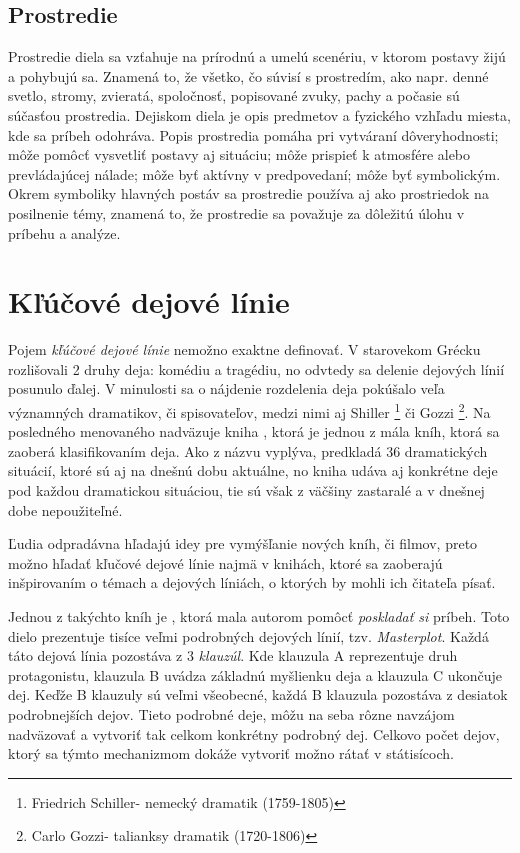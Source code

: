\subsection*{Prostredie}
Prostredie diela sa vzťahuje na prírodnú a umelú scenériu, v ktorom postavy žijú a pohybujú sa. Znamená to, že všetko, čo súvisí s prostredím, ako napr. denné svetlo, stromy, zvieratá, spoločnosť, popisované zvuky, pachy a počasie sú súčasťou prostredia. Dejiskom diela je opis predmetov a fyzického vzhľadu miesta, kde sa príbeh odohráva.
Popis prostredia pomáha pri vytváraní dôveryhodnosti; môže pomôcť vysvetliť postavy aj situáciu; môže prispieť k atmosfére alebo prevládajúcej nálade; môže byť aktívny v predpovedaní; môže byť symbolickým. Okrem symboliky hlavných postáv sa prostredie používa aj ako prostriedok na posilnenie témy, znamená to, že prostredie sa považuje za dôležitú úlohu v príbehu a analýze.


\section{Kľúčové dejové línie}
Pojem \textit{kľúčové dejové línie} nemožno exaktne definovať. V starovekom Grécku rozlišovali 
2 druhy deja: komédiu a tragédiu, no odvtedy sa delenie dejových línií posunulo ďalej. V minulosti sa o nájdenie rozdelenia deja pokúšalo veľa významných dramatikov, či spisovateľov, medzi nimi aj Shiller \footnote{Friedrich Schiller- nemecký dramatik (1759-1805)
} či Gozzi \footnote{Carlo Gozzi- talianksy dramatik (1720-1806)}. Na posledného menovaného nadväzuje kniha  \cite{Polti:1921}, ktorá je jednou z mála kníh, ktorá sa zaoberá klasifikovaním deja. Ako z názvu vyplýva, predkladá 36 dramatických situácií, ktoré sú aj na dnešnú dobu aktuálne, no kniha udáva aj konkrétne deje pod každou dramatickou situáciou, tie sú však z väčšiny zastaralé a v dnešnej dobe nepoužiteľné.

Ľudia odpradávna hľadajú idey pre vymýšľanie nových kníh, či filmov, preto možno hľadať kľučové dejové línie najmä v knihách, ktoré sa zaoberajú inšpirovaním o témach a dejových líniách, o ktorých by mohli ich čitateľa písať. 

Jednou z takýchto kníh je  \cite{Cook:1928}, ktorá mala autorom pomôcť \textit{poskladať si} príbeh. Toto dielo prezentuje tisíce veľmi podrobných dejových línií, tzv. \textit{Masterplot}. Každá táto dejová línia pozostáva z 3 \textit{klauzúl}. Kde klauzula A reprezentuje druh protagonistu, klauzula B uvádza základnú myšlienku deja a klauzula C ukončuje dej. Keďže B klauzuly sú veľmi všeobecné, každá B klauzula pozostáva z desiatok podrobnejších dejov. Tieto podrobné deje, môžu na seba rôzne navzájom nadväzovať a vytvoriť tak celkom konkrétny podrobný dej. Celkovo počet dejov, ktorý sa týmto mechanizmom dokáže vytvoriť možno rátať v státisícoch.

